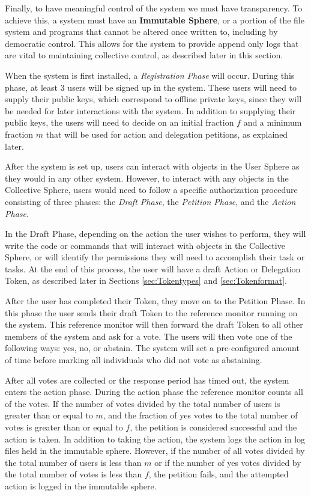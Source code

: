 Finally, to have meaningful control of the system we must have transparency. To
achieve this, a system must have an \textbf{Immutable Sphere}, or a portion of
the file system and programs that cannot be altered once written to, including
by democratic control. This allows for the system to provide append only logs
that are vital to maintaining collective control, as described later in this
section.

When the system is first installed, a \textit{Registration Phase} will occur.
During this phase, at least 3 users will be signed up in the system. These users
will need to supply their public keys, which correspond to offline private keys,
since they will be needed for later interactions with the system. In addition to
supplying their public keys, the users will need to decide on an initial
fraction $f$ and a minimum fraction $m$ that will be used for action and
delegation petitions, as explained later.

After the system is set up, users can interact with objects in the User Sphere
as they would in any other system. However, to interact with any objects in the
Collective Sphere, users would need to follow a specific authorization
procedure consisting of three phases: the \textit{Draft Phase}, the 
\textit{Petition Phase}, and the \textit{Action Phase}.

In the Draft Phase, depending on the action the user wishes to perform, they
will write the code or commands that will interact with objects in the
Collective Sphere, or will identify the permissions they will need to accomplish
their task or tasks. At the end of this process, the user will have a draft
Action or Delegation Token, as described later in Sections \ref{sec:Tokentypes}
and \ref{sec:Tokenformat}.

After the user has completed their Token, they move on to the Petition Phase. In
this phase the user sends their draft Token to the reference monitor running on
the system. This reference monitor will then forward the draft Token to all
other members of the system and ask for a vote. The users will then vote one of
the following ways: yes, no, or abstain. The system will set a pre-configured
amount of time before marking all individuals who did not vote as abstaining.

After all votes are collected or the response period has timed out, the system
enters the action phase. During the action phase the reference monitor counts
all of the votes. If the number of votes divided by the total number of users is
greater than or equal to $m$, and the fraction of yes votes to the total number
of votes is greater than or equal to $f$, the petition is considered successful
and the action is taken. In addition to taking the action, the system logs the
action in log files held in the immutable sphere. However, if the number of all
votes divided by the total number of users is less than $m$ or if the number of
yes votes divided by the total number of votes is less than $f$, the petition
fails, and the attempted action is logged in the immutable sphere.

